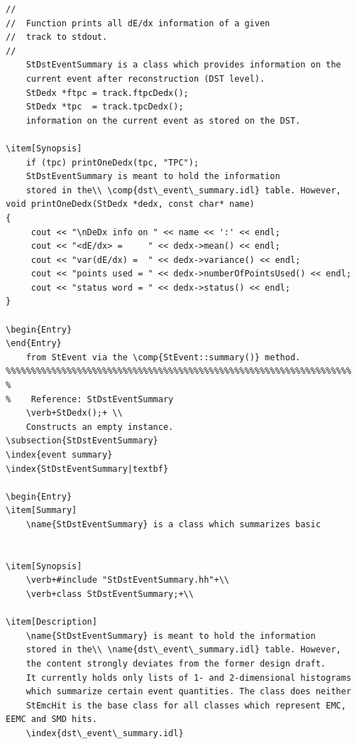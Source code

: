 \item[Examples]
{\footnotesize
\begin{verbatim}
//
//  Function prints all dE/dx information of a given
//  track to stdout.
//
    StDstEventSummary is a class which provides information on the
    current event after reconstruction (DST level). 
    StDedx *ftpc = track.ftpcDedx();
    StDedx *tpc  = track.tpcDedx();
    information on the current event as stored on the DST. 
    
\item[Synopsis] 
    if (tpc) printOneDedx(tpc, "TPC");
    StDstEventSummary is meant to hold the information
    stored in the\\ \comp{dst\_event\_summary.idl} table. However,
void printOneDedx(StDedx *dedx, const char* name)
{
     cout << "\nDeDx info on " << name << ':' << endl;
     cout << "<dE/dx> =     " << dedx->mean() << endl;
     cout << "var(dE/dx) =  " << dedx->variance() << endl;
     cout << "points used = " << dedx->numberOfPointsUsed() << endl;
     cout << "status word = " << dedx->status() << endl;
}
    
\begin{Entry}
\end{Entry}
    from StEvent via the \comp{StEvent::summary()} method.
%%%%%%%%%%%%%%%%%%%%%%%%%%%%%%%%%%%%%%%%%%%%%%%%%%%%%%%%%%%%%%%%%%%%
%
%    Reference: StDstEventSummary
    \verb+StDedx();+ \\
    Constructs an empty instance.
\subsection{StDstEventSummary}
\index{event summary}
\index{StDstEventSummary|textbf}
    
\begin{Entry}
\item[Summary]
    \name{StDstEventSummary} is a class which summarizes basic
    

\item[Synopsis]
    \verb+#include "StDstEventSummary.hh"+\\
    \verb+class StDstEventSummary;+\\

\item[Description]
    \name{StDstEventSummary} is meant to hold the information
    stored in the\\ \name{dst\_event\_summary.idl} table. However,
    the content strongly deviates from the former design draft.
    It currently holds only lists of 1- and 2-dimensional histograms
    which summarize certain event quantities. The class does neither
    StEmcHit is the base class for all classes which represent EMC, EEMC and SMD hits.
    \index{dst\_event\_summary.idl}


\end{verbatim}}
